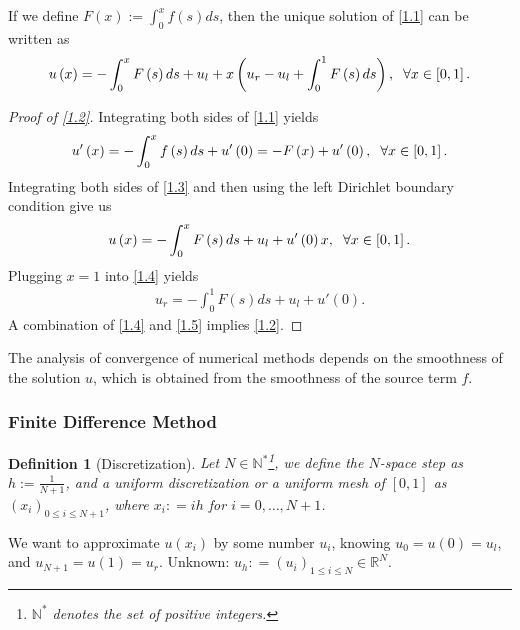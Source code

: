 \documentclass[11pt,a4paper,center,notitlepage]{article}
\numberwithin{equation}{section}
\newtheorem{definition}{Definition}[section]
\begin{document}
If we define $F\left( x \right) := \int_0^x {f\left( s \right)ds} $, then the unique solution of \eqref{1.1} can be written as
\begin{align}
\label{1.2}
u\left( x \right) =  - \int_0^x {F\left( s \right)ds}  + {u_l} + x\left( {{u_r} - {u_l} + \int_0^1 {F\left( s \right)ds} } \right), \hspace{2mm} \forall x\in \left[0,1\right]. 
\end{align}
\begin{proof}[Proof of \eqref{1.2}]
Integrating both sides of \eqref{1.1} yields
\begin{align}
\label{1.3}
  u'\left( x \right) = -\int_0^x {f\left( s \right)ds}  + u'\left( 0 \right) = -F\left( x \right) + u'\left( 0 \right), \hspace{2mm} \forall  x\in \left[0,1\right].
\end{align}
Integrating both sides of \eqref{1.3} and then using the left Dirichlet boundary condition give us
\begin{align}
\label{1.4}
u\left( x \right) =  - \int_0^x {F\left( s \right)ds} +u_l + u'\left( 0 \right)x, \hspace{2mm} \forall  x \in \left[ {0,1} \right].
\end{align}
Plugging $x=1$ into \eqref{1.4} yields 
\begin{align}
\label{1.5}
{u_r} =  - \int_0^1 {F\left( s \right)ds} +{u_l} + u'\left( 0 \right).
\end{align}
A combination of \eqref{1.4} and \eqref{1.5} implies \eqref{1.2}. 
\end{proof}
The analysis of convergence of numerical methods depends on the smoothness of the solution $u$, which is obtained from the smoothness of the source term $f$. 
\subsubsection{Finite Difference Method}
\begin{definition}[Discretization]\label{def1.1}
Let $N\in \mathbb{N}^*$\footnote{$\mathbb{N}^*$ denotes the set of positive integers.}, we define the $N$-\emph{space step} as $h:=\frac{1}{N+1}$, and a \emph{uniform discretization} or a \emph{uniform mesh} of $\left[0,1\right]$ as ${\left( {{x_i}} \right)_{0 \le i \le N + 1}}$, where ${x_i}: = ih$ for $i = 0, \ldots ,N + 1$.
\end{definition}
We want to approximate $u\left(x_i\right)$ by some number $u_i$, knowing $u_0 = u\left(0\right) =u_l$, and $u_{N+1} = u\left(1\right) =u_r$. Unknown: ${u_h}: = {\left( {{u_i}} \right)_{1 \le i \le N}} \in {\mathbb{R}^N}$.
\end{document}
